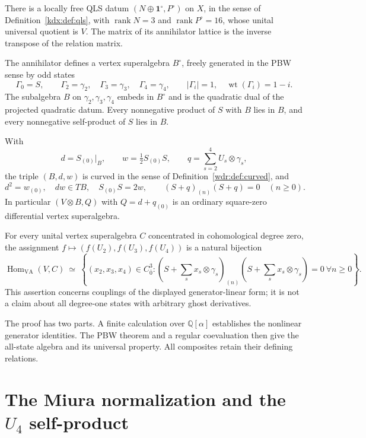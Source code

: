 \begin{theorem}\label{w4d:thm:main}
There is a locally free QLS datum $(N\oplus\mathbf1^\circ,P^\circ)$
on $X$, in the sense of Definition~\ref{kdx:def:qls}, with
$\operatorname{rank}N=3$ and $\operatorname{rank}P^\circ=16$, whose
unital universal quotient is $V$. The matrix of its annihilator
lattice is the inverse transpose of the relation matrix.

The annihilator defines a vertex superalgebra $B^\circ$, freely generated in the PBW sense by odd states
\[
 \Gamma_0=S,\qquad\Gamma_2=\gamma_2,\quad\Gamma_3=\gamma_3,\quad\Gamma_4=\gamma_4,
 \qquad |\Gamma_i|=1,\quad\operatorname{wt}(\Gamma_i)=1-i.
\]
The subalgebra $B$ on $\gamma_2,\gamma_3,\gamma_4$ embeds in $B^\circ$ and is the quadratic dual of the projected quadratic datum. Every nonnegative product of $S$ with $B$ lies in $B$, and every nonnegative self-product of $S$ lies in $B$.

With
\[
 d=S_{(0)}|_B,\qquad w=\tfrac12S_{(0)}S,
 \qquad q=\sum_{s=2}^4U_s\otimes\gamma_s,
\]
the triple $(B,d,w)$ is curved in the sense of Definition~\ref{wdr:def:curved}, and
\[
 d^2=w_{(0)},\quad dw\in TB,\quad S_{(0)}S=2w,
 \qquad (S+q)_{(n)}(S+q)=0\quad(n\geq0).
\]
In particular $(V\otimes B,Q)$ with $Q=d+q_{(0)}$ is an ordinary square-zero differential vertex superalgebra.

For every unital vertex superalgebra $C$ concentrated in cohomological degree zero, the assignment $f\mapsto (f(U_2),f(U_3),f(U_4))$ is a natural bijection
\[
 \operatorname{Hom}_{\mathrm{VA}}(V,C)\ \simeq\
 \left\{(x_2,x_3,x_4)\in C_{\bar0}^3:
 (S+\textstyle\sum_s x_s\otimes\gamma_s)_{(n)}
 (S+\textstyle\sum_s x_s\otimes\gamma_s)=0\ \forall n\geq0\right\}.
\]
This assertion concerns couplings of the displayed generator-linear form; it is not a claim about all degree-one states with arbitrary ghost derivatives.
\end{theorem}

The proof has two parts. A finite calculation over $\mathbb Q[\alpha]$ establishes the nonlinear generator identities. The PBW theorem and a regular coevaluation then give the all-state algebra and its universal property. All composites retain their defining relations.

\section{The Miura normalization and the \texorpdfstring{$U_4$}{U4} self-product}
